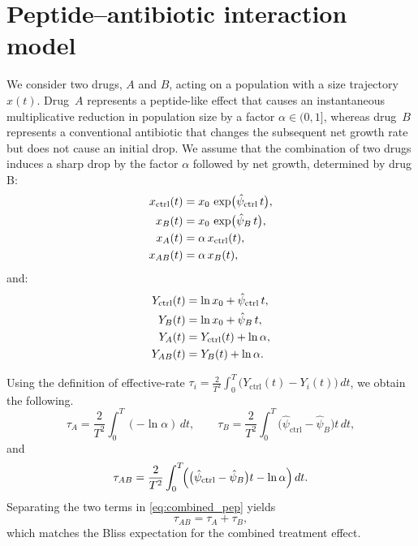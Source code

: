 \section{Peptide--antibiotic interaction model}\label{ssec:toy_model}
We consider two drugs, \(A\) and \(B\), acting on a population with a size trajectory \(x(t)\).
Drug~\(A\) represents a peptide-like effect that causes an instantaneous multiplicative reduction in population size by a factor \(\alpha\in(0,1]\), whereas drug~\(B\) represents a conventional antibiotic that changes the subsequent net growth rate but does not cause an initial drop.
We assume that the combination of two drugs induces a sharp drop by the factor $\alpha$ followed by net growth, determined by drug B:
\begin{align}
  x_{\mathrm{ctrl}}(t) &= x_0\,\exp\!\big(\hat{\psi}_{\mathrm{ctrl}}\,t\big), \notag\\
  x_{B}(t) &= x_0\,\exp\!\big(\hat{\psi}_{B}\,t\big), \notag\\
  x_{A}(t) &= \alpha\,x_{\mathrm{ctrl}}(t), \notag\\
  x_{AB}(t) &= \alpha\,x_{B}(t), \notag
\end{align}
and:
\begin{align}
  Y_{\mathrm{ctrl}}(t) &= \ln x_0+\hat{\psi}_{\mathrm{ctrl}}\,t, \notag\\
  Y_{B}(t) &= \ln x_0+\hat{\psi}_{B}\,t, \notag\\
  Y_{A}(t) &= Y_{\mathrm{ctrl}}(t)+\ln \alpha, \notag\\
  Y_{AB}(t) &= Y_{B}(t)+\ln \alpha. \notag
\end{align}

Using the definition of effective-rate \(\tau_i=\frac{2}{T^2}\int_0^T\!\big(Y_{\mathrm{ctrl}}(t)-Y_i(t)\big)\,dt\), we obtain the following.
\[
  \tau_A=\frac{2}{T^2}\int_0^T\!(-\ln\alpha)\,dt, \qquad
  \tau_B=\frac{2}{T^2}\int_0^T\!\bigl(\hat{\psi}_{\mathrm{ctrl}}-\hat{\psi}_B\bigr)t\,dt,
\]
and
\begin{equation}
  \tau_{AB} =
  \frac{2}{T^2}\int_0^T\!\Bigl(\bigl(\hat{\psi}_{\mathrm{ctrl}}-\hat{\psi}_B\bigr)t-\ln\alpha\Bigr)\,dt.
  \label{eq:combined_pep}
\end{equation}
Separating the two terms in \autoref{eq:combined_pep} yields
\begin{equation}
  \tau_{AB}=\tau_A+\tau_B,
  \label{eq:toy_model}
\end{equation}
which matches the Bliss expectation for the combined treatment effect.

